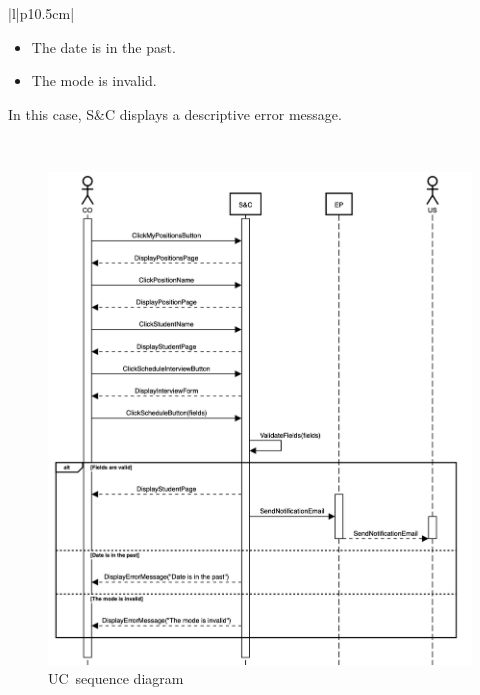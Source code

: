 \begin{longtable}{|l|p{10.5cm}|}
\begin{minipage}[t]{\linewidth}
            \vspace{-\baselineskip}
            \begin{itemize}[leftmargin=*, label=\tiny\textbullet]
                \item The date is in the past.
                \item The mode is invalid.
            \end{itemize}
            In this case, S\&C displays a descriptive error message.
            \vspace{10pt}
        \end{minipage} \\ \hline
\caption{Use case \theuc}
\end{longtable}

\begin{figure}
    \centering
    \includegraphics[width=16cm]{images/sequence-diagrams/company-schedules-interview.png}
    \caption{UC\theuc\ sequence diagram}
\end{figure}


